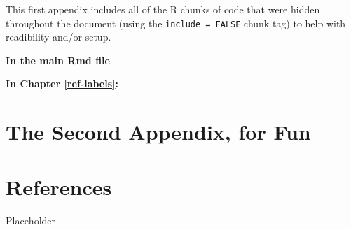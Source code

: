 \documentclass[12pt,twoside]{reedthesis}
\theoremstyle{definition}
\theoremstyle{definition}
\theoremstyle{definition}
\theoremstyle{remark}
\begin{document}
This first appendix includes all of the R chunks of code that were
hidden throughout the document (using the \texttt{include\ =\ FALSE}
chunk tag) to help with readibility and/or setup.

\textbf{In the main Rmd file}

\textbf{In Chapter \ref{ref-labels}:}

\chapter{The Second Appendix, for
Fun}\label{the-second-appendix-for-fun}

\chapter*{References}\label{references}

Placeholder


\end{document}
